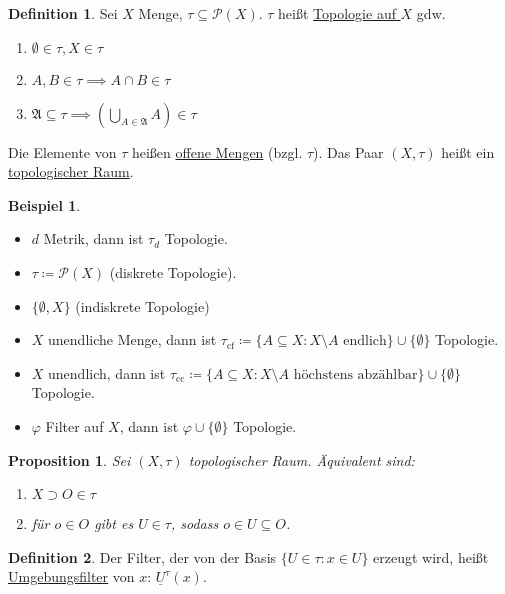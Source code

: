 \documentclass[12pt]{scrartcl}%
\newtheorem{prop}{Proposition}
\theoremstyle{definition}
\newtheorem*{defn}{Definition}
\newtheorem{ex}{Beispiel}
\theoremstyle{remark}
\newcommand{\powerset}{\mathcal{P}}
\begin{document}
\begin{defn}
    Sei $X$ Menge, $\tau\subseteq \powerset(X)$. $\tau$ heißt \underline{Topologie auf $X$} gdw.

    \begin{enumerate}[label=(\arabic*)]
        \item $\emptyset\in\tau, X\in\tau$
        \item $A,B\in\tau \implies A\cap B\in \tau$
        \item $\mathfrak{A}\subseteq \tau \implies \left(\bigcup_{A\in\mathfrak{A}} A\right) \in \tau$
    \end{enumerate}

    Die Elemente von $\tau$ heißen \underline{offene Mengen} (bzgl. $\tau$). Das Paar $(X,\tau)$ heißt ein \underline{topologischer Raum}. %
\end{defn}

\begin{ex}
    \begin{itemize}
        \item $d$ Metrik, dann ist $\tau_d$ Topologie.
        \item $\tau\coloneqq \powerset(X)$ (diskrete Topologie).
        \item $\{\emptyset, X\}$ (indiskrete Topologie)
        \item $X$ unendliche Menge, dann ist $\tau_\text{cf}\coloneqq \{ A\subseteq X: X\setminus A \text{ endlich} \} \cup \{\emptyset\}$ Topologie.
        \item $X$ unendlich, dann ist $\tau_\text{cc} \coloneqq \{ A\subseteq X: X\setminus A \text{ höchstens abzählbar}\} \cup \{\emptyset\}$ Topologie.
        \item $\varphi$ Filter auf $X$, dann ist $\varphi\cup \{\emptyset\}$ Topologie.
    \end{itemize}
\end{ex}

\begin{prop}
    Sei $(X, \tau)$ topologischer Raum. Äquivalent sind:

    \begin{enumerate}[label=(\arabic*)]
        \item $X\supset O\in \tau$
        \item für $o\in O$ gibt es $U\in\tau$, sodass $o\in U\subseteq O$.
    \end{enumerate}
\end{prop}

\begin{defn}
    Der Filter, der von der Basis $\{U\in\tau: x\in U\}$ erzeugt wird, heißt \underline{Umgebungsfilter} von $x$: $\underline{U}^\tau(x)$.
\end{defn}
\end{document}
